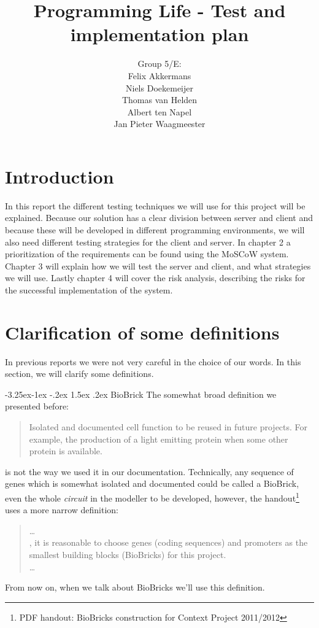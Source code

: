 \documentclass[a4paper]{article}
\title{Programming Life - Test and implementation plan }
\author{Group 5/E:\\
Felix Akkermans \\
Niels Doekemeijer \\
Thomas van Helden \\
Albert ten Napel \\
Jan Pieter Waagmeester}
\makeatletter
\renewcommand\paragraph{\@startsection{paragraph}{4}{\z@}%
  {-3.25ex\@plus -1ex \@minus -.2ex}%
  {1.5ex \@plus .2ex}%
  {\normalfont\normalsize\bfseries}}
\makeatother
\begin{document}
\maketitle

\vfill

\small{\tableofcontents}
\pagebreak

\section{Introduction}
In this report the different testing techniques we will use for this project will be explained. Because our solution has a clear division between server and client and because these will be developed in different programming environments, we will also need different testing strategies for the client and server. In chapter 2 a prioritization of the requirements can be found using the MoSCoW system. Chapter 3 will explain how we will test the server and client, and what strategies we will use. Lastly chapter 4 will cover the risk analysis, describing the risks for the successful implementation of the system.

\section{Clarification of some definitions}
In previous reports we were not very careful in the choice of our words. In this section, we will clarify some definitions.

\paragraph{BioBrick}
The somewhat broad definition we presented before:
\begin{quote}Isolated and documented cell function to be reused in future projects. For example, the production of a light emitting protein when some other protein is available.
\end{quote}
is not the way we used it in our documentation. Technically, any sequence of genes which is somewhat isolated and documented could be called a BioBrick, even the whole \textit{circuit} in the modeller to be developed, however, the handout\footnote{PDF handout: BioBricks construction for Context Project 2011/2012} uses a more narrow definition:
\begin{quote}
	\dots \\
	, it is reasonable to choose genes (coding sequences) and promoters as the smallest building blocks (BioBricks) for this project.\\ \dots
\end{quote}
From now on, when we talk about BioBricks we'll use this definition.
\end{document}
